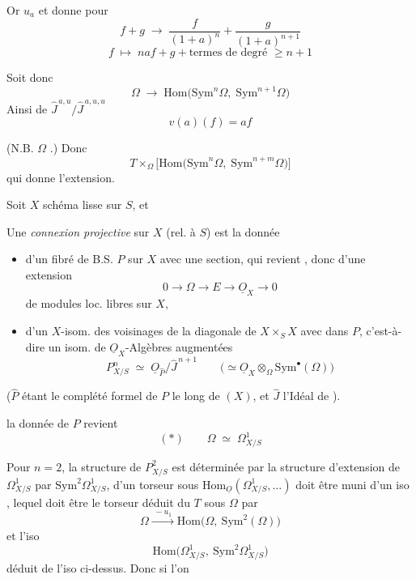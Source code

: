 \documentclass[11pt,a4paper]{article}
\begin{document}
Or $u_a$ \ill{} et donne pour \ill{}
\[
  f + g \;\longrightarrow\; \frac{f}{(1+a)^{n}} + \frac{g}{(1+a)^{n+1}}
\]
\[
  f \;\longmapsto\; naf + g + \text{termes de degré } \geqslant n + 1
\]

Soit donc
\[
  \Omega \;\longrightarrow\; \mathrm{Hom}\big( \mathrm{Sym}^n \Omega,\;
  \mathrm{Sym}^{n+1} \Omega \big)
\]
Ainsi \ill{} de
$\widehat{J}^{\,a,u} \big/ \widehat{J}^{\,a,u,u}$ \ill{}
\[
  v(a)(f) = af
\]
\struck{\ill{}}

(N.B. \ill{} $\Omega$ \ill{}.) Donc
\[
  T \times_{\Omega} \big[ \mathrm{Hom}\big( \mathrm{Sym}^n \Omega,\;
  \mathrm{Sym}^{n+m} \Omega \big) \big]
\]
\ill{} qui donne l'extension.


Soit $X$ schéma lisse sur $S$, \struck{\ill{}} et \ill{}

Une \emph{connexion projective} sur $X$ (rel. à $S$) est la donnée
\begin{itemize}
  \item[a)] d'un fibré de B.S. $P$ sur $X$ avec une section, \ill{} qui
  revient \ill{}, donc \ill{} d'une extension
  \[
    0 \longrightarrow \Omega \longrightarrow E \longrightarrow
    \underline{O}_X \longrightarrow 0
  \]
  de modules loc. libres sur $X$, \ill{}
  \item[b)] d'un $X$-isom. des voisinages \ill{} de la diagonale de
  $X \times_S X$ avec \ill{} dans $P$, \ill{} c'est-à-dire un isom. de
  $\underline{O}_X$-Algèbres augmentées
  \[
    P^n_{X/S} \;\simeq\; \underline{O}_{\widehat{P}}
    \big/ \widehat{J}^{\,n+1}
    \qquad \big( \simeq \underline{O}_X \otimes_{\Omega}
    \mathrm{Sym}^{\bullet}(\Omega) \big)
  \]
\end{itemize}
($\widehat{P}$ étant le complété formel de $P$ le long de \ill{} $(X)$, et
$\widehat{J}$ l'Idéal de \ill{}).

\ill{} la donnée de $P$ \ill{} revient \ill{}
\[
  (*) \qquad \Omega \;\simeq\; \Omega^1_{X/S}
\]

Pour $n = 2$, la structure de $P^2_{X/S}$ \ill{} est déterminée par la
structure \ill{} d'extension de $\Omega^1_{X/S}$ par
$\mathrm{Sym}^2 \Omega^1_{X/S}$, \ill{}  d'un torseur
sous \ill{} $\mathrm{Hom}_{\underline{O}}(\Omega^1_{X/S}, \ldots)$ \ill{}
doit être muni d'un iso \ill{}, lequel doit être \ill{} le torseur déduit du
$T$ sous $\Omega$ \ill{} par
\[
  \Omega \xrightarrow{\;-u_1\;}
  \mathrm{Hom}\big( \Omega,\ \mathrm{Sym}^2(\Omega) \big)
\]
et l'iso
\[
  \mathrm{Hom}\big( \Omega^1_{X/S},\ \mathrm{Sym}^2 \Omega^1_{X/S} \big)
\]
déduit de l'iso ci-dessus. Donc si l'on \ill{}
\end{document}
